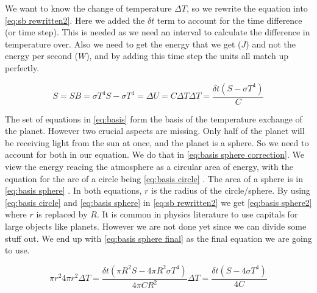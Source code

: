 We want to know the change of temperature $\Delta T$, so we rewrite the equation into \autoref{eq:sb rewritten2}. Here we added the $\delta t$ term to account for the time difference (or time 
step). This is needed as we need an interval to calculate the difference in temperature over. Also we need to get the energy that we get ($J$) and not the energy per second ($W$), and by adding 
this time step the units all match up perfectly.

\begin{subequations}
    \begin{equation}
        S = SB = \sigma T^4
        \label{eq:stefan-boltzmann}
    \end{equation}
    \begin{equation}
        S - \sigma T^4 = \Delta U = C \Delta T
        \label{eq:sb rewritten}
    \end{equation}
    \begin{equation}
        \Delta T = \frac{\delta t(S - \sigma T^4)}{C}
        \label{eq:sb rewritten2}
    \end{equation}
    \label{eq:basis}
\end{subequations}

The set of equations in \autoref{eq:basis} form the basis of the temperature exchange of the planet. However two crucial aspects are missing. Only half of the planet will be receiving light from 
the sun at once, and the planet is a sphere. So we need to account for both in our equation. We do that in \autoref{eq:basis sphere correction}. We view the energy reacing the atmosphere as a 
circular area of energy, with the equation for the are of a circle being \autoref{eq:basis circle} \cite{areaCircle}. The area of a sphere is in \autoref{eq:basis sphere} \cite{areaSphere}. In 
both equations, $r$ is the radius of the circle/sphere. By using \autoref{eq:basis circle} and \autoref{eq:basis sphere} in \autoref{eq:sb rewritten2} we get \autoref{eq:basis sphere2} where 
$r$ is replaced by $R$. It is common in physics literature to use capitals for large objects like planets. However we are not done yet since we can divide some stuff out. We end up with 
\autoref{eq:basis sphere final} as the final equation we are going to use.

\begin{subequations}
    \begin{equation}
        \pi r^2
        \label{eq:basis circle}
    \end{equation}
    \begin{equation}
        4 \pi r^2
        \label{eq:basis sphere}
    \end{equation}
    \begin{equation}
        \Delta T = \frac{\delta t (\pi R^2S - 4\pi R^2\sigma T^4)}{4\pi CR^2}
        \label{eq:basis sphere2}
    \end{equation}
    \begin{equation}
        \Delta T = \frac{\delta t (S - 4\sigma T^4)}{4C}
        \label{eq:basis sphere final}
    \end{equation}
    \label{eq:basis sphere correction}
\end{subequations}

